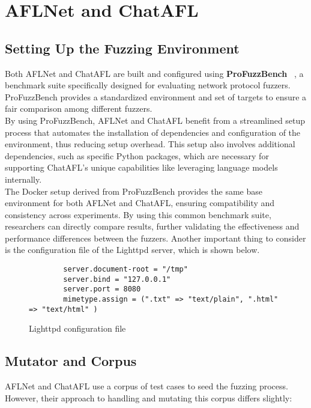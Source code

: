 \section{AFLNet and ChatAFL}

\subsection{Setting Up the Fuzzing Environment}

Both AFLNet and ChatAFL are built and configured using \textbf{ProFuzzBench} ~\cite{profuzzbench}, a benchmark suite specifically designed for evaluating network protocol fuzzers. ProFuzzBench provides a standardized environment and set of targets to ensure a fair comparison among different fuzzers.
\\By using ProFuzzBench, AFLNet and ChatAFL benefit from a streamlined setup process that automates the installation of dependencies and configuration of the environment, thus reducing setup overhead. This setup also involves additional dependencies, such as specific Python packages, which are necessary for supporting ChatAFL's unique capabilities like leveraging language models internally.
\\The Docker setup derived from ProFuzzBench provides the same base environment for both AFLNet and ChatAFL, ensuring compatibility and consistency across experiments. By using this common benchmark suite, researchers can directly compare results, further validating the effectiveness and performance differences between the fuzzers.
Another important thing to consider is the configuration file of the Lighttpd server, which is shown below.\\
\begin{figure}[H]
    \begin{lstlisting}
        server.document-root = "/tmp"
        server.bind = "127.0.0.1"
        server.port = 8080
        mimetype.assign = (".txt" => "text/plain", ".html" => "text/html" )
    \end{lstlisting}
    \caption{Lighttpd configuration file}
    \label{fig:lighttpd_conf_aflnetchatafl}
\end{figure}

\subsection{Mutator and Corpus}

AFLNet and ChatAFL use a corpus of test cases to seed the fuzzing process. However, their approach to handling and mutating this corpus differs slightly:

